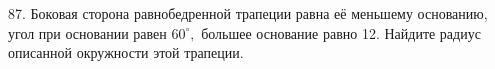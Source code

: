 87. Боковая сторона равнобедренной трапеции равна её меньшему основанию, угол при основании равен $60^\circ,$ большее основание равно 12. Найдите радиус описанной окружности этой трапеции.\\
